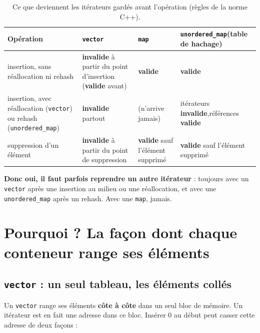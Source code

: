 \documentclass[11pt,a4paper]{article}
\newcommand{\oui}{\textcolor{vert}{\textbf{valide}}}
\newcommand{\non}{\textcolor{rouge}{\textbf{invalide}}}
\begin{document}
\begin{table}[H]
\centering
\small
\begin{tabular}{|p{3.6cm}|p{4.2cm}|p{3.4cm}|p{3.4cm}|}
\hline
\textbf{Opération} & \textbf{\texttt{vector}} & \textbf{\texttt{map}} & \textbf{\texttt{unordered\_map}}\newline\textbf{(table de hachage)} \\
\hline
insertion, sans réallocation ni rehash
  & \non{} à partir du point d'insertion (\oui{} avant)
  & \oui{}
  & \oui{} \\
\hline
insertion, avec réallocation (\texttt{vector}) ou rehash (\texttt{unordered\_map})
  & \non{} partout
  & (n'arrive jamais)
  & itérateurs \non{},\newline références \oui{} \\
\hline
suppression d'un élément
  & \non{} à partir du point de suppression
  & \oui{} sauf l'élément supprimé
  & \oui{} sauf l'élément supprimé \\
\hline
\end{tabular}
\caption{Ce que deviennent les itérateurs gardés avant l'opération (règles de la norme C++).}
\end{table}

\textbf{Donc oui, il faut parfois reprendre un autre itérateur} : toujours avec un
\texttt{vector} après une insertion au milieu ou une réallocation, et avec une
\texttt{unordered\_map} après un rehash. Avec une \texttt{map}, jamais.

\section{Pourquoi ? La façon dont chaque conteneur range ses éléments}

\subsection{\texttt{vector} : un seul tableau, les éléments collés}

Un \texttt{vector} range ses éléments \textbf{côte à côte} dans un seul bloc de mémoire. Un
itérateur est en fait une adresse dans ce bloc. Insérer 0 au début peut casser cette
adresse de deux façons :
\end{document}
